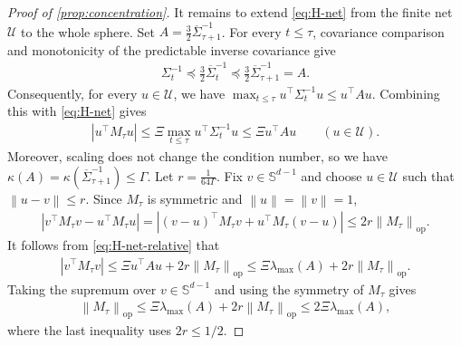 \documentclass[11pt]{article}
\newcommand{\op}{\mathrm{op}}
\newcommand{\1}{\mathbf 1}
\newcommand{\norm}[1]{\left\lVert #1\right\rVert}
\begin{document}
\begin{proof}[Proof of \cref{prop:concentration}]
    It remains to extend \eqref{eq:H-net} from the finite net
    $\mathcal U$ to the whole sphere.
    Set $A=\frac32\overline\Sigma_{\tau+1}^{-1}$.
    For every $t\leq\tau$, covariance comparison and monotonicity of
    the predictable inverse covariance give
    \begin{align}
        \Sigma_t^{-1}
        \preceq
        \frac32\overline\Sigma_t^{-1}
        \preceq
        \frac32\overline\Sigma_{\tau+1}^{-1}
        =
        A.
        \label{eq:H-terminal-dominates}
    \end{align}
    Consequently, for every $u\in\mathcal U$,
    we have
    $\max_{t\leq\tau}u^\top\Sigma_t^{-1}u
        \leq
        u^\top Au$.
    Combining this with \eqref{eq:H-net} gives
    \begin{align}
        |u^\top M_\tau u|
        \leq
        \Xi
        \max_{t\leq\tau}u^\top\Sigma_t^{-1}u
        \leq
        \Xi u^\top Au
        \qquad(u\in\mathcal U).
        \label{eq:H-net-relative}
    \end{align}
    Moreover, scaling does not change the condition number, so we have
    $\kappa(A) = \kappa(\overline\Sigma_{\tau+1}^{-1}) \leq\Gamma$.
    Let $r=\frac{1}{64\Gamma}$.
    Fix $v\in\mathbb S^{d-1}$ and choose $u\in\mathcal U$ such that
    $\norm{u-v}\leq r$. Since $M_\tau$ is symmetric and
    $\norm{u}=\norm{v}=1$,
    \begin{align}
        \left|
        v^\top M_\tau v-u^\top M_\tau u
        \right|
        =
        \left|
        (v-u)^\top M_\tau v
        +
        u^\top M_\tau(v-u)
        \right|
        \leq
        2r\norm{M_\tau}_{\op}.
        \label{eq:H-net-approximation}
    \end{align}
    It follows from \eqref{eq:H-net-relative} that
    \begin{align}
        |v^\top M_\tau v|
        \leq
        \Xi u^\top Au
        +
        2r\norm{M_\tau}_{\op}
        \leq
        \Xi \lambda_{\max}(A)
        +
        2r\norm{M_\tau}_{\op}.
    \end{align}
    Taking the supremum over $v\in\mathbb S^{d-1}$ and using the
    symmetry of $M_\tau$ gives
    \begin{align}
        \norm{M_\tau}_{\op}
        \leq
        \Xi \lambda_{\max}(A)
        +
        2r\norm{M_\tau}_{\op}
        \leq
        2\Xi \lambda_{\max}(A),
        \label{eq:H-operator-bound}
    \end{align}
    where the last inequality uses $2r\leq1/2$.


\end{proof}
\end{document}
